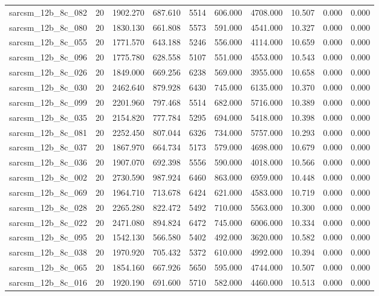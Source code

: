 \begin{tabular}{lrrrrrrrrr}
sarcsm\_12b\_8c\_082 & 20 & 1902.270 & 687.610 & 5514 & 606.000 & 4708.000 & 10.507 & 0.000 & 0.000 \\
sarcsm\_12b\_8c\_080 & 20 & 1830.130 & 661.808 & 5573 & 591.000 & 4541.000 & 10.327 & 0.000 & 0.000 \\
sarcsm\_12b\_8c\_055 & 20 & 1771.570 & 643.188 & 5246 & 556.000 & 4114.000 & 10.659 & 0.000 & 0.000 \\
sarcsm\_12b\_8c\_096 & 20 & 1775.780 & 628.558 & 5107 & 551.000 & 4553.000 & 10.543 & 0.000 & 0.000 \\
sarcsm\_12b\_8c\_026 & 20 & 1849.000 & 669.256 & 6238 & 569.000 & 3955.000 & 10.658 & 0.000 & 0.000 \\
sarcsm\_12b\_8c\_030 & 20 & 2462.640 & 879.928 & 6430 & 745.000 & 6135.000 & 10.370 & 0.000 & 0.000 \\
sarcsm\_12b\_8c\_099 & 20 & 2201.960 & 797.468 & 5514 & 682.000 & 5716.000 & 10.389 & 0.000 & 0.000 \\
sarcsm\_12b\_8c\_035 & 20 & 2154.820 & 777.784 & 5295 & 694.000 & 5418.000 & 10.398 & 0.000 & 0.000 \\
sarcsm\_12b\_8c\_081 & 20 & 2252.450 & 807.044 & 6326 & 734.000 & 5757.000 & 10.293 & 0.000 & 0.000 \\
sarcsm\_12b\_8c\_037 & 20 & 1867.970 & 664.734 & 5173 & 579.000 & 4698.000 & 10.679 & 0.000 & 0.000 \\
sarcsm\_12b\_8c\_036 & 20 & 1907.070 & 692.398 & 5556 & 590.000 & 4018.000 & 10.566 & 0.000 & 0.000 \\
sarcsm\_12b\_8c\_002 & 20 & 2730.590 & 987.924 & 6460 & 863.000 & 6959.000 & 10.448 & 0.000 & 0.000 \\
sarcsm\_12b\_8c\_069 & 20 & 1964.710 & 713.678 & 6424 & 621.000 & 4583.000 & 10.719 & 0.000 & 0.000 \\
sarcsm\_12b\_8c\_028 & 20 & 2265.280 & 822.472 & 5492 & 710.000 & 5563.000 & 10.300 & 0.000 & 0.000 \\
sarcsm\_12b\_8c\_022 & 20 & 2471.080 & 894.824 & 6472 & 745.000 & 6006.000 & 10.334 & 0.000 & 0.000 \\
sarcsm\_12b\_8c\_095 & 20 & 1542.130 & 566.580 & 5402 & 492.000 & 3620.000 & 10.582 & 0.000 & 0.000 \\
sarcsm\_12b\_8c\_038 & 20 & 1970.920 & 705.432 & 5372 & 610.000 & 4992.000 & 10.394 & 0.000 & 0.000 \\
sarcsm\_12b\_8c\_065 & 20 & 1854.160 & 667.926 & 5650 & 595.000 & 4744.000 & 10.507 & 0.000 & 0.000 \\
sarcsm\_12b\_8c\_016 & 20 & 1920.190 & 691.600 & 5710 & 582.000 & 4460.000 & 10.513 & 0.000 & 0.000 \\

\end{tabular}
